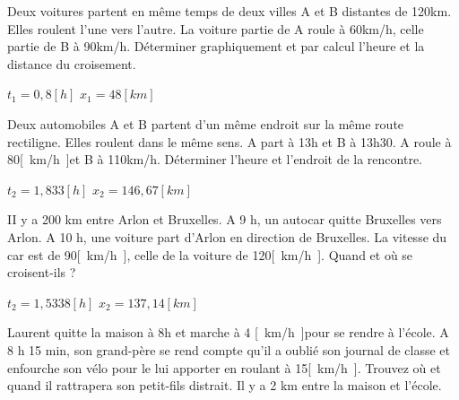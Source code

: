 \begin{exercise}
\end{exercise}

\begin{exercise}
    Deux voitures partent en même temps de deux villes A et B distantes de 120km. Elles roulent l'une vers l'autre. La voiture partie de A roule à 60km/h, celle partie de B à 90km/h. Déterminer graphiquement et par calcul l'heure et la distance du croisement.
\end{exercise}
\begin{solution}
    \(t_1=0,8[h]\)
    \(x_1=48[km]\)
\end{solution}

\begin{exercise}
    Deux automobiles A et B partent d'un même endroit sur la même route rectiligne. Elles roulent dans le même sens. A part à 13h et B à 13h30. A roule à 80\unit{[km/h]}et B à 110km/h. Déterminer l'heure et l'endroit de la rencontre.
\end{exercise}
\begin{solution}
    \(t_2=1,833[h]\)
    \(x_2=146,67[km]\)
\end{solution}



\begin{exercise}
    II y a 200 km entre Arlon et Bruxelles. A 9 h, un autocar quitte Bruxelles vers Arlon. A 10 h, une voiture  part d'Arlon en direction de Bruxelles. La vitesse du car est de 90\unit{[km/h]}, celle de la voiture de 120\unit{[km/h]}. Quand et où se croisent-ils ?
\end{exercise}
\begin{solution}
    \(t_2=1,5338[h]\)
    \(x_2=137,14[km]\)
\end{solution}

\begin{exercise}
    Laurent quitte la maison à 8h et marche à 4 \unit{[km/h]}pour se rendre à l'école. A 8 h 15 min, son grand-père se rend compte qu'il a oublié son journal de classe et enfourche son vélo pour le lui apporter en roulant à 15\unit{[km/h]}. Trouvez où et quand il rattrapera son petit-fils distrait. Il y a 2 km entre la maison et l'école.
\end{exercise}
\begin{solution}
\end{solution}

